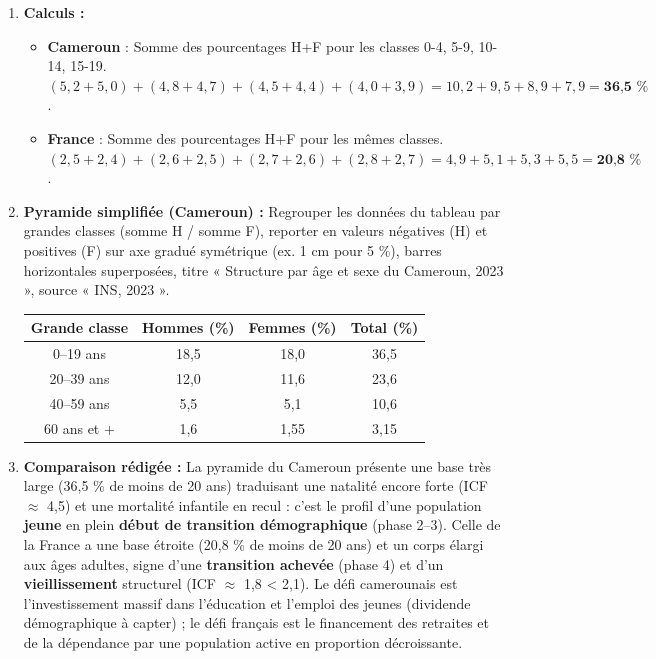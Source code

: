 \documentclass[11pt]{article}
\begin{document}
\begin{corrige}[Exercice 1]
\begin{enumerate}
\item \textbf{Calculs :}
\begin{itemize}
\item \textbf{Cameroun} : Somme des pourcentages H+F pour les classes 0-4, 5-9, 10-14, 15-19.
$ (5,2+5,0) + (4,8+4,7) + (4,5+4,4) + (4,0+3,9) = 10,2 + 9,5 + 8,9 + 7,9 = \textbf{36,5 \%} $.
\item \textbf{France} : Somme des pourcentages H+F pour les mêmes classes.
$ (2,5+2,4) + (2,6+2,5) + (2,7+2,6) + (2,8+2,7) = 4,9 + 5,1 + 5,3 + 5,5 = \textbf{20,8 \%} $.
\end{itemize}
\item \textbf{Pyramide simplifiée (Cameroun) :} Regrouper les données du tableau par grandes classes (somme H / somme F), reporter en valeurs négatives (H) et positives (F) sur axe gradué symétrique (ex. 1 cm pour 5 \%), barres horizontales superposées, titre « Structure par âge et sexe du Cameroun, 2023 », source « INS, 2023 ».
\begin{center}
\begin{tabular}{|c|cc|c|}\hline
\textbf{Grande classe} & \textbf{Hommes (\%)} & \textbf{Femmes (\%)} & \textbf{Total (\%)} \\ \hline
0--19 ans & 18,5 & 18,0 & 36,5 \\
20--39 ans & 12,0 & 11,6 & 23,6 \\
40--59 ans & 5,5 & 5,1 & 10,6 \\
60 ans et + & 1,6 & 1,55 & 3,15 \\ \hline
\end{tabular}
\end{center}
\item \textbf{Comparaison rédigée :}
La pyramide du Cameroun présente une base très large (36,5 \% de moins de 20 ans) traduisant une natalité encore forte (ICF $\approx$ 4,5) et une mortalité infantile en recul : c'est le profil d'une population \textbf{jeune} en plein \textbf{début de transition démographique} (phase 2--3). Celle de la France a une base étroite (20,8 \% de moins de 20 ans) et un corps élargi aux âges adultes, signe d'une \textbf{transition achevée} (phase 4) et d'un \textbf{vieillissement} structurel (ICF $\approx$ 1,8 < 2,1). Le défi camerounais est l'investissement massif dans l'éducation et l'emploi des jeunes (dividende démographique à capter) ; le défi français est le financement des retraites et de la dépendance par une population active en proportion décroissante.
\end{enumerate}
\end{corrige}
\end{document}
